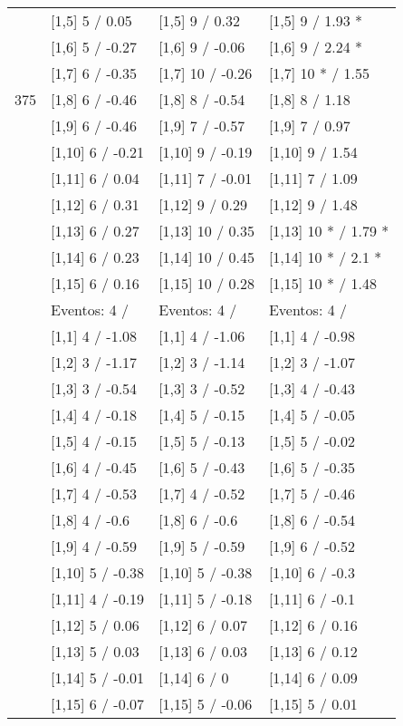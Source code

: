\begin{table}
\begin{tabular}[t]{llll}
 & {}[1,5] 5  / 0.05 & {}[1,5] 9  / 0.32 & {}[1,5] 9  / 1.93 *\\
 & {}[1,6] 5  / -0.27 & {}[1,6] 9  / -0.06 & {}[1,6] 9  / 2.24 *\\
 & {}[1,7] 6  / -0.35 & {}[1,7] 10  / -0.26 & {}[1,7] 10 * / 1.55\\
375 & {}[1,8] 6  / -0.46 & {}[1,8] 8  / -0.54 & {}[1,8] 8  / 1.18\\
\addlinespace
 & {}[1,9] 6  / -0.46 & {}[1,9] 7  / -0.57 & {}[1,9] 7  / 0.97\\
 & {}[1,10] 6  / -0.21 & {}[1,10] 9  / -0.19 & {}[1,10] 9  / 1.54\\
 & {}[1,11] 6  / 0.04 & {}[1,11] 7  / -0.01 & {}[1,11] 7  / 1.09\\
 & {}[1,12] 6  / 0.31 & {}[1,12] 9  / 0.29 & {}[1,12] 9  / 1.48\\
 & {}[1,13] 6  / 0.27 & {}[1,13] 10  / 0.35 & {}[1,13] 10 * / 1.79 *\\
\addlinespace
 & {}[1,14] 6  / 0.23 & {}[1,14] 10  / 0.45 & {}[1,14] 10 * / 2.1 *\\
 & {}[1,15] 6  / 0.16 & {}[1,15] 10  / 0.28 & {}[1,15] 10 * / 1.48\\
 & Eventos:  4 / & Eventos:  4 / & Eventos:  4 /\\
 & {}[1,1] 4  / -1.08 & {}[1,1] 4  / -1.06 & {}[1,1] 4  / -0.98\\
 & {}[1,2] 3  / -1.17 & {}[1,2] 3  / -1.14 & {}[1,2] 3  / -1.07\\
\addlinespace
 & {}[1,3] 3  / -0.54 & {}[1,3] 3  / -0.52 & {}[1,3] 4  / -0.43\\
 & {}[1,4] 4  / -0.18 & {}[1,4] 5  / -0.15 & {}[1,4] 5  / -0.05\\
 & {}[1,5] 4  / -0.15 & {}[1,5] 5  / -0.13 & {}[1,5] 5  / -0.02\\
 & {}[1,6] 4  / -0.45 & {}[1,6] 5  / -0.43 & {}[1,6] 5  / -0.35\\
 & {}[1,7] 4  / -0.53 & {}[1,7] 4  / -0.52 & {}[1,7] 5  / -0.46\\
\addlinespace
500 & {}[1,8] 4  / -0.6 & {}[1,8] 6  / -0.6 & {}[1,8] 6  / -0.54\\
 & {}[1,9] 4  / -0.59 & {}[1,9] 5  / -0.59 & {}[1,9] 6  / -0.52\\
 & {}[1,10] 5  / -0.38 & {}[1,10] 5  / -0.38 & {}[1,10] 6  / -0.3\\
 & {}[1,11] 4  / -0.19 & {}[1,11] 5  / -0.18 & {}[1,11] 6  / -0.1\\
 & {}[1,12] 5  / 0.06 & {}[1,12] 6  / 0.07 & {}[1,12] 6  / 0.16\\
\addlinespace
 & {}[1,13] 5  / 0.03 & {}[1,13] 6  / 0.03 & {}[1,13] 6  / 0.12\\
 & {}[1,14] 5  / -0.01 & {}[1,14] 6  / 0 & {}[1,14] 6  / 0.09\\
 & {}[1,15] 6  / -0.07 & {}[1,15] 5  / -0.06 & {}[1,15] 5  / 0.01\\
\bottomrule
\end{tabular}
\end{table}
